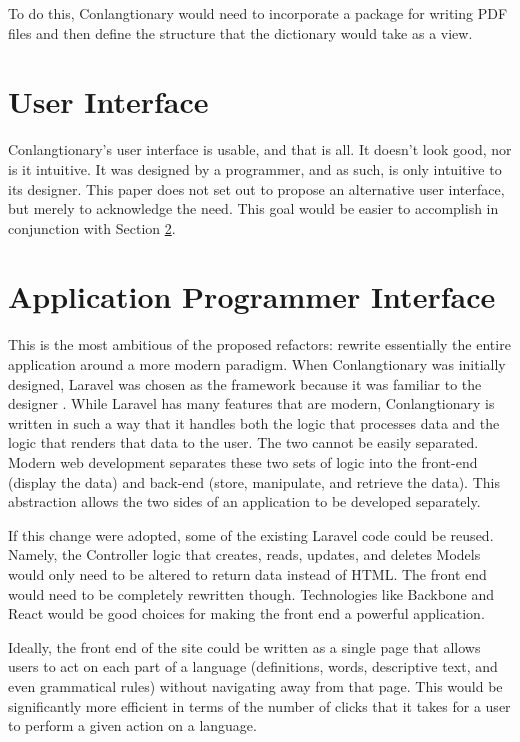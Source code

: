 To do this, Conlangtionary would need to incorporate a package for writing PDF files and then define the structure that the dictionary would take as a view.

\section{User Interface}
\label{sec:refactor-ui}

Conlangtionary's user interface is usable, and that is all. It doesn't look good, nor is it intuitive. It was designed by a programmer, and as such, is only intuitive to its designer. This paper does not set out to propose an alternative user interface, but merely to acknowledge the need. This goal would be easier to accomplish in conjunction with Section \ref{sec:refactor-api}.

\section{Application Programmer Interface}
\label{sec:refactor-api}

This is the most ambitious of the proposed refactors: rewrite essentially the entire application around a more modern paradigm. When Conlangtionary was initially designed, Laravel was chosen as the framework because it was familiar to the designer \cite{Laravel}. While Laravel has many features that are modern, Conlangtionary is written in such a way that it handles both the logic that processes data and the logic that renders that data to the user. The two cannot be easily separated. Modern web development separates these two sets of logic into the front-end (display the data) and back-end (store, manipulate, and retrieve the data). This abstraction allows the two sides of an application to be developed separately.

If this change were adopted, some of the existing Laravel code could be reused. Namely, the Controller logic that creates, reads, updates, and deletes Models would only need to be altered to return data instead of HTML. The front end would need to be completely rewritten though. Technologies like Backbone and React would be good choices for making the front end a powerful application.

Ideally, the front end of the site could be written as a single page that allows users to act on each part of a language (definitions, words, descriptive text, and even grammatical rules) without navigating away from that page. This would be significantly more efficient in terms of the number of clicks that it takes for a user to perform a given action on a language.

